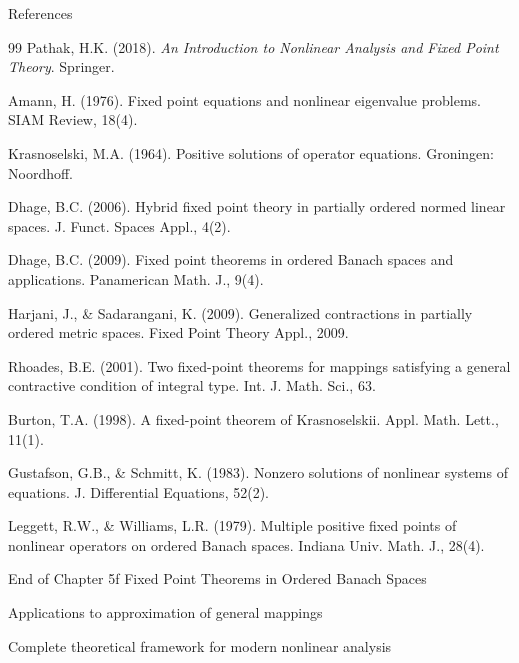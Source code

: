 \documentclass[aspectratio=169,10pt]{beamer}
\theoremstyle{plain}
\begin{document}
\begin{frame}[allowframebreaks]{References}
  \small

  \begin{thebibliography}{99}
     Pathak, H.K. (2018). \emph{An Introduction to Nonlinear Analysis and Fixed Point Theory}. Springer.

     Amann, H. (1976). Fixed point equations and nonlinear eigenvalue problems. SIAM Review, 18(4).

     Krasnoselski, M.A. (1964). Positive solutions of operator equations. Groningen: Noordhoff.

     Dhage, B.C. (2006). Hybrid fixed point theory in partially ordered normed linear spaces. J. Funct. Spaces Appl., 4(2).

     Dhage, B.C. (2009). Fixed point theorems in ordered Banach spaces and applications. Panamerican Math. J., 9(4).

     Harjani, J., \& Sadarangani, K. (2009). Generalized contractions in partially ordered metric spaces. Fixed Point Theory Appl., 2009.

     Rhoades, B.E. (2001). Two fixed-point theorems for mappings satisfying a general contractive condition of integral type. Int. J. Math. Sci., 63.

     Burton, T.A. (1998). A fixed-point theorem of Krasnoselskii. Appl. Math. Lett., 11(1).

     Gustafson, G.B., \& Schmitt, K. (1983). Nonzero solutions of nonlinear systems of equations. J. Differential Equations, 52(2).

     Leggett, R.W., \& Williams, L.R. (1979). Multiple positive fixed points of nonlinear operators on ordered Banach spaces. Indiana Univ. Math. J., 28(4).
  \end{thebibliography}
\end{frame}

\begin{frame}{End of Chapter 5f}
  \centering
  \Huge
  Fixed Point Theorems in Ordered Banach Spaces

  \vspace{2em}

  \Large
  Applications to approximation of general mappings

  \vspace{2em}

  \normalsize
  Complete theoretical framework for modern nonlinear analysis
\end{frame}
\end{document}

